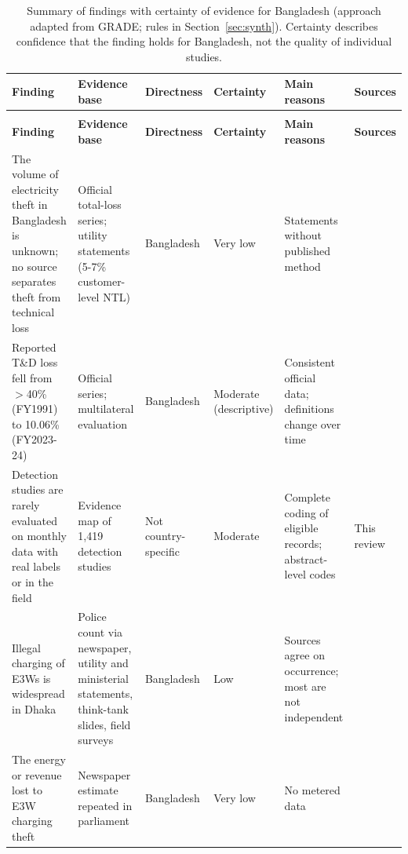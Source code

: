 \begingroup
\scriptsize
\renewcommand{\arraystretch}{1.12}
\setlength{\tabcolsep}{3pt}
\begin{xltabular}{\textwidth}{>{\raggedright\arraybackslash{}\hsize}X>{\raggedright\arraybackslash{}\hsize}X>{\raggedright\arraybackslash{}\hsize}X>{\raggedright\arraybackslash{}\hsize}X>{\raggedright\arraybackslash{}\hsize}X>{\raggedright\arraybackslash{}\hsize}X}
\caption{Summary of findings with certainty of evidence for Bangladesh (approach adapted from GRADE; rules in Section~\ref{sec:synth}). Certainty describes confidence that the finding holds for Bangladesh, not the quality of individual studies.}\label{tab:t11} \\
\toprule
\textbf{Finding} & \textbf{Evidence base} & \textbf{Directness} & \textbf{Certainty} & \textbf{Main reasons} & \textbf{Sources} \\
\midrule
\endfirsthead
{} \\
\toprule
\textbf{Finding} & \textbf{Evidence base} & \textbf{Directness} & \textbf{Certainty} & \textbf{Main reasons} & \textbf{Sources} \\
\midrule
\endhead
\bottomrule
\endlastfoot
The volume of electricity theft in Bangladesh is unknown; no source separates theft from technical loss & Official total-loss series; utility statements (5-7\% customer-level NTL) & Bangladesh & Very low & Statements without published method & \citealp{powercell2025systemloss,bss2025pdb,bss2025dpdc} \\
Reported T\&D loss fell from $>$40\% (FY1991) to 10.06\% (FY2023-24) & Official series; multilateral evaluation & Bangladesh & Moderate (descriptive) & Consistent official data; definitions change over time & \citealp{powercell2025systemloss,adb2003cost,alam2024fixing} \\
Detection studies are rarely evaluated on monthly data with real labels or in the field & Evidence map of 1,419 detection studies & Not country-specific & Moderate & Complete coding of eligible records; abstract-level codes & This review \\
Illegal charging of E3Ws is widespread in Dhaka & Police count via newspaper, utility and ministerial statements, think-tank slides, field surveys & Bangladesh & Low & Sources agree on occurrence; most are not independent & \citealp{islam2025banglatesla,bonikbarta2026battery,mahmud2025integrating} \\
The energy or revenue lost to E3W charging theft & Newspaper estimate repeated in parliament & Bangladesh & Very low & No metered data & \citealp{islam2025banglatesla,tbs2026illegal} \\

\end{xltabular}
